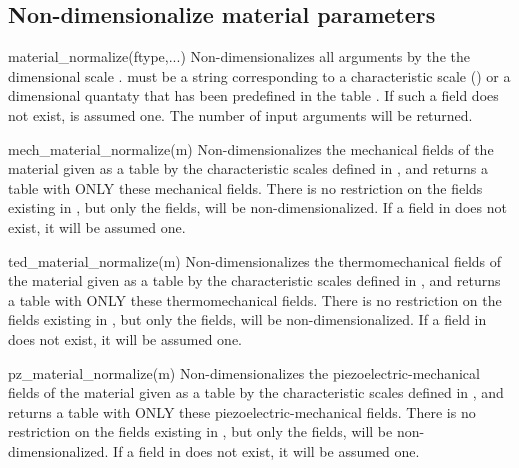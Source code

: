 \subsection{Non-dimensionalize material parameters}
\begin{codelist}
  \item[material\_normalize(ftype,...)]
    Non-dimensionalizes all arguments  by the the dimensional
    scale .  must be a string corresponding
    to a characteristic scale () or a dimensional quantaty
     that has been predefined in the table 
    . If such a field does not exist, 
     is assumed one. The number of input arguments
    will be returned.
  \item[mech\_material\_normalize(m)]
    Non-dimensionalizes the mechanical fields of the material  
    given as a table by the characteristic scales defined in , 
    and returns a table with ONLY these mechanical fields. There is no 
    restriction on the fields existing in , but only the fields,
     will be 
    non-dimensionalized. 
    If a field in  does not exist, it
    will be assumed one. 
  \item[ted\_material\_normalize(m)]
    Non-dimensionalizes the thermomechanical fields of the material  
    given as a table by the characteristic scales defined in , 
    and returns a table with ONLY these thermomechanical fields. There is no 
    restriction on the fields existing in , but only the fields,
     will be 
    non-dimensionalized.
    If a field in  does not exist, it
    will be assumed one. 
  \item[pz\_material\_normalize(m)]
    Non-dimensionalizes the piezoelectric-mechanical fields of the 
    material  
    given as a table by the characteristic scales defined in , 
    and returns a table with ONLY these piezoelectric-mechanical fields. 
    There is no 
    restriction on the fields existing in , but only the fields,
     will be 
    non-dimensionalized.
    If a field in  does not exist, it
    will be assumed one. 
\end{codelist}
